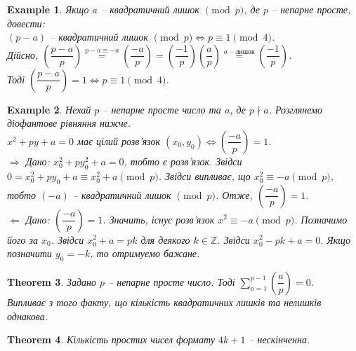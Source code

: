 \documentclass[a4paper, 10pt]{article}
\theoremstyle{theoremdd}
\newtheorem{theorem}{Theorem}[subsection]
\theoremstyle{theoremdd}
\theoremstyle{theoremdd}
\theoremstyle{theoremdd}
\newtheorem{example}[theorem]{Example}
\theoremstyle{theoremdd}
\theoremstyle{theoremdd}
\theoremstyle{theoremdd}
\theoremstyle{theoremdd}
\def\rightproof{$\boxed{\Rightarrow}$ }
\def\leftproof{$\boxed{\Leftarrow}$ }
\begin{document}
\begin{example}
Якщо $a$ -- квадратичний лишок $\!\! \pmod p$, де $p$ -- непарне просте, довести:\\
$(p-a)$ -- квадратичний лишок $\!\! \pmod p \iff p \equiv 1 \pmod 4$.\\
Дійсно, $\left( \dfrac{p-a}{p} \right) \overset{p-a \equiv -a}{=} \left( \dfrac{-a}{p} \right) = \left( \dfrac{-1}{p} \right) \left( \dfrac{a}{p} \right) \overset{a \text{ -- лишок}}{=} \left( \dfrac{-1}{p} \right)$.\\
Тоді $\left( \dfrac{p-a}{p} \right) =1 \iff p \equiv 1 \pmod 4$.
\end{example}

\begin{example}
Нехай $p$ -- непарне просте число та $a$, де $p \nmid a$. Розглянемо діофантове рівняння нижче.\\
$x^2 + py + a = 0$ має цілий розв'язок $(x_0,y_0) \iff \left( \dfrac{-a}{p} \right) = 1$.
\bigskip \\
\rightproof Дано: $x_0^2 + py_0^2 + a = 0$, тобто є розв'язок. Звідси $0 = x_0^2 + py_0 + a \equiv x_0^2 + a \pmod p$. Звідси випливає, що $x_0^2 \equiv -a \pmod p$, тобто $(-a)$ -- квадратичний лишок $\!\! \pmod p$. Отже, $\left( \dfrac{-a}{p} \right) = 1$.
\bigskip \\
\leftproof Дано: $\left( \dfrac{-a}{p} \right) = 1$. Значить, існує розв'язок $x^2 \equiv -a \pmod p$. Позначимо його за $x_0$. Звідси $x_0^2 + a = pk$ для деякого $k \in \mathbb{Z}$. Звідси $x_0^2 - pk + a = 0$. Якщо позначити $y_0 = -k$, то отримуємо бажане.  
\end{example}

\begin{theorem}
Задано $p$ -- непарне просте число. Тоді $\displaystyle\sum_{a=1}^{p-1} \left( \dfrac{a}{p} \right) = 0$.\\
\textit{Випливає з того факту, що кількість квадратичних лишків та нелишків однакова.}
\end{theorem}

\begin{theorem}
Кількість простих чисел формату $4k+1$ -- нескінченна.
\end{theorem}
\end{document}
